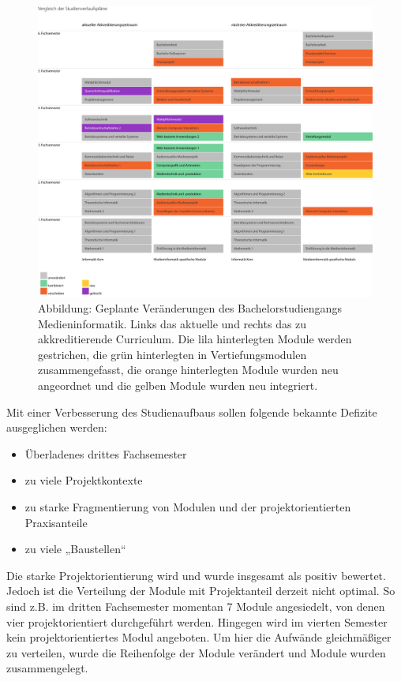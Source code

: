 \begin{figure}[htbp]
\centering
\includegraphics[width=\columnwidth]{../anhaenge/bilder/ba-veraenderungen-studienverlaufsplan.png}
\caption{Abbildung: Geplante Veränderungen des Bachelorstudiengangs
Medieninformatik. Links das aktuelle und rechts das zu akkreditierende
Curriculum. Die lila hinterlegten Module werden gestrichen, die grün
hinterlegten in Vertiefungsmodulen zusammengefasst, die orange
hinterlegten Module wurden neu angeordnet und die gelben Module wurden
neu integriert.}
\end{figure}

Mit einer Verbesserung des Studienaufbaus sollen folgende bekannte
Defizite ausgeglichen werden:

\begin{itemize}
\tightlist
\item
  Überladenes drittes Fachsemester
\item
  zu viele Projektkontexte
\item
  zu starke Fragmentierung von Modulen und der projektorientierten
  Praxisanteile
\item
  zu viele „Baustellen``
\end{itemize}

Die starke Projektorientierung wird und wurde insgesamt als positiv
bewertet. Jedoch ist die Verteilung der Module mit Projektanteil derzeit
nicht optimal. So sind z.B. im dritten Fachsemester momentan 7 Module
angesiedelt, von denen vier projektorientiert durchgeführt werden.
Hingegen wird im vierten Semester kein projektorientiertes Modul
angeboten. Um hier die Aufwände gleichmäßiger zu verteilen, wurde die
Reihenfolge der Module verändert und Module wurden zusammengelegt.

